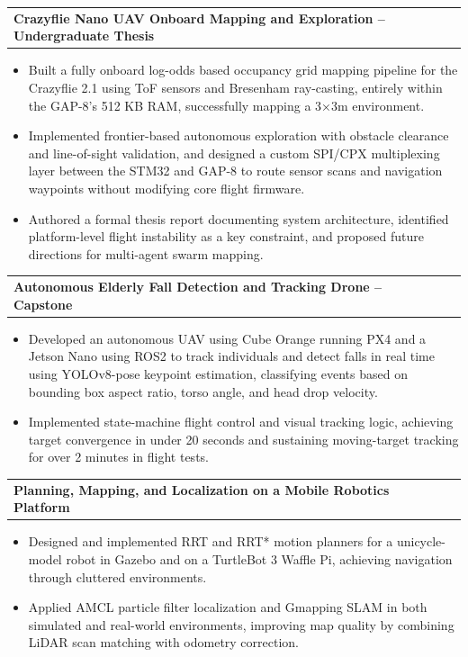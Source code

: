 \documentclass[letterpaper,11pt]{article}
\makeatletter
\newcommand{\resumeItem}[1]{
  \item\small{
    {#1 \vspace{-2.5pt}}
  }
}
\newcommand{\resumeProjectHeading}[2]{
    \item
    \begin{tabular*}{0.97\textwidth}{l@{\extracolsep{\fill}}r}
      \small#1 & #2 \\
    \end{tabular*}\vspace{-7pt}
}
\newcommand{\resumeItemListStart}{\begin{itemize}}
\newcommand{\resumeItemListEnd}{\end{itemize}\vspace{-5pt}}
\newcommand\z{-2.4pt}
\makeatother
\begin{document}
\resumeProjectHeading
      {\textbf{Crazyflie Nano UAV Onboard Mapping and Exploration -- Undergraduate Thesis}}{ }
      \resumeItemListStart
    \resumeItem{Built a fully onboard log-odds based occupancy grid mapping pipeline for the Crazyflie 2.1 using ToF sensors and 
    Bresenham ray-casting, entirely within the GAP-8's 512 KB 
    RAM, successfully mapping a 3×3m environment.}
        \resumeItem{Implemented frontier-based autonomous exploration with obstacle clearance and line-of-sight validation, and designed a custom SPI/CPX multiplexing layer between the STM32 and GAP-8 to route sensor scans and navigation waypoints without modifying core flight firmware.}
		  \resumeItem{Authored a formal thesis report documenting system architecture, identified platform-level 
    flight instability as a key constraint, and proposed future directions for multi-agent swarm mapping.}
\resumeItemListEnd
\vspace{\z}

\resumeProjectHeading
      {\textbf{Autonomous Elderly Fall Detection and Tracking Drone -- Capstone}}{ }
      \resumeItemListStart
       \resumeItem{Developed an autonomous UAV using Cube Orange running PX4 and a Jetson Nano using ROS2 to track individuals and detect falls in real time using YOLOv8-pose keypoint estimation, classifying events based on bounding box aspect ratio, torso angle, and head drop velocity.}
		\resumeItem{Implemented state-machine flight control and visual tracking logic, achieving target convergence in under 20 seconds and sustaining moving-target tracking for over 2 minutes in flight tests.}

      \resumeItemListEnd
\vspace{\z}

\resumeProjectHeading{\textbf{Planning, Mapping, and Localization on a Mobile Robotics Platform }}{ }
\resumeItemListStart
	\resumeItem{Designed and implemented RRT and RRT* motion planners for a unicycle-model robot in Gazebo and on a TurtleBot 3 Waffle Pi, achieving navigation through cluttered environments.}
	\resumeItem{Applied AMCL particle filter localization and Gmapping SLAM in both simulated and real-world environments, improving map quality by combining LiDAR scan matching with odometry correction.}
\resumeItemListEnd
\end{document}
